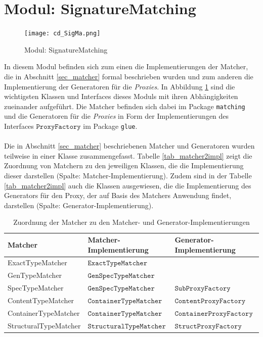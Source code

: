 \section{Modul: SignatureMatching}\label{impl_sigma}
\begin{figure}[h!]
\texttt{[image: cd\_SigMa.png]}
\caption{Modul: SignatureMatching}
\label{fig_cdSigMa}
\end{figure}
\noindent
In diesem \Gls{Modul} befinden sich zum einen die Implementierungen der Matcher, die in Abschnitt \ref{sec_matcher} formal beschrieben wurden und zum anderen die Implementierung der Generatoren für die \emph{Proxies}. In Abbildung \ref{fig_cdSigMa} sind die wichtigsten Klassen und \Gls{Interface}s dieses \Gls{Modul}s mit ihren Abhängigkeiten zueinander aufgeführt. Die Matcher befinden sich dabei im Package \texttt{matching} und die Generatoren für die \emph{Proxies} in Form der Implementierungen des \Gls{Interface}s $\texttt{ProxyFactory}$ im Package \texttt{glue}.
\\\\
Die in Abschnitt \ref{sec_matcher} beschriebenen Matcher und Generatoren wurden teilweise in einer Klasse zusammengefasst. Tabelle \ref{tab_matcher2impl} zeigt die Zuordnung von Matchern zu den jeweiligen Klassen, die die Implementierung dieser darstellen (Spalte: Matcher-Implementierung). Zudem sind in der Tabelle \ref{tab_matcher2impl} auch die Klassen ausgewiesen, die die Implementierung des Generators für den Proxy, der auf Basis des Matchers Anwendung findet, darstellen (Spalte: Generator-Implementierung).
\begin{table}[h!]
\centering
\begin{tabular}{|l|l|l|}
\hline
\hline
\textbf{Matcher} & \textbf{Matcher-Implementierung} & \textbf{Generator-Implementierung}\\
\hline
ExactTypeMatcher & $\texttt{ExactTypeMatcher}$ &  \\
\hline
GenTypeMatcher & $\texttt{GenSpecTypeMatcher}$ & \\
\hline
SpecTypeMatcher & $\texttt{GenSpecTypeMatcher}$ & $\texttt{SubProxyFactory}$\\
\hline
ContentTypeMatcher & $\texttt{ContainerTypeMatcher}$ & $\texttt{ContentProxyFactory}$\\
\hline
ContainerTypeMatcher & $\texttt{ContainerTypeMatcher}$ & $\texttt{ContainerProxyFactory}$\\
\hline
StructuralTypeMatcher & $\texttt{StructuralTypeMatcher}$ & $\texttt{StructProxyFactory}$\\
\hline
\hline
\end{tabular}
\caption{Zuordnung der Matcher zu den Matcher- und Generator-Implementierungen}
\end{table}\label{tab_matcher2impl}
